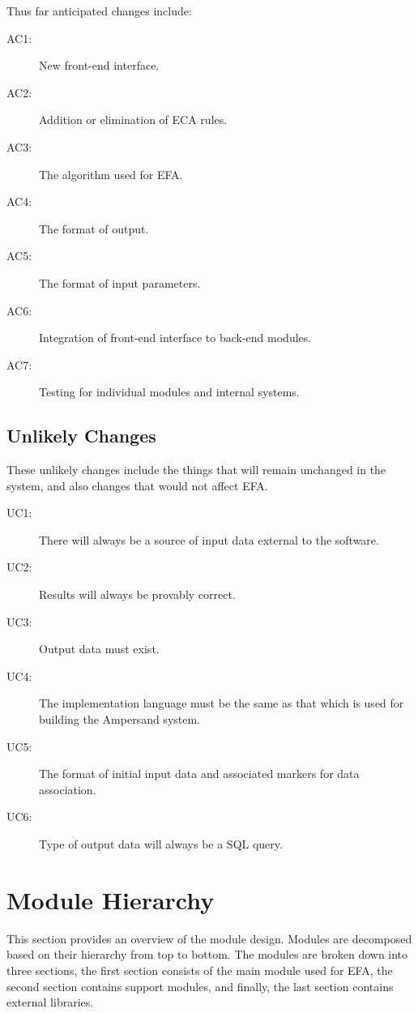 \documentclass[12pt, svgnames]{article}
\begin{document}
Thus far anticipated changes include:

\begin{description}
    \item[AC1:] New front-end interface.
    \item[AC2:] Addition or elimination of ECA rules.
    \item[AC3:] The algorithm used for EFA.
    \item[AC4:] The format of output.
    \item[AC5:] The format of input parameters.
    \item[AC6:] Integration of front-end interface to back-end modules.
    \item[AC7:] Testing for individual modules and internal systems.
    
\end{description}

\subsection{Unlikely Changes} 

These unlikely changes include the things that will remain unchanged in the 
system, and also changes that would not affect EFA. 

\begin{description}
    \item[UC1:] There will always be a source of input data external to the 
    software.
    \item[UC2:] Results will always be provably correct.
    \item[UC3:] Output data must exist.
    \item[UC4:] The implementation language must be the same as that which is 
    used for building the Ampersand system.
    \item[UC5:] The format of initial input data and associated markers for 
    data association.
    \item[UC6:] Type of output data will always be a SQL query.
\end{description}

\section{Module Hierarchy}
This section provides an overview of the module design. Modules are decomposed 
based on their hierarchy from top to bottom. The modules are broken down into 
three sections, the first section consists of the main module used for EFA, 
the second section contains support modules, and finally, the last section
contains external libraries.
\end{document}

